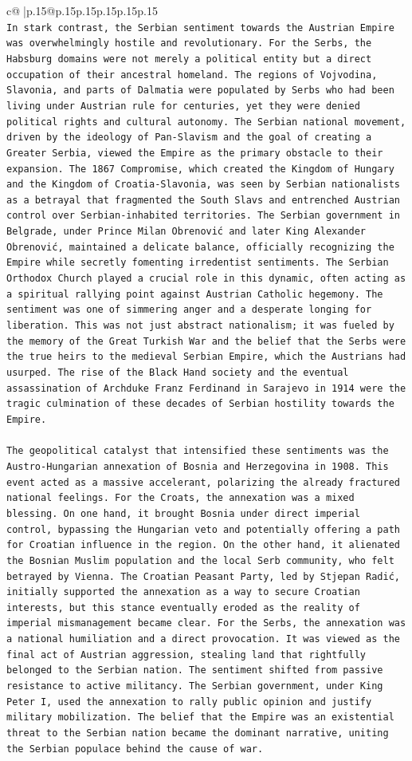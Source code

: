 \documentclass{article}
\begin{document}
{\begin{supertabular}{c@{$\;$}|p{.15\linewidth}@{}p{.15\linewidth}p{.15\linewidth}p{.15\linewidth}p{.15\linewidth}p{.15\linewidth}}
{{{\\ 
\texttt{In stark contrast, the Serbian sentiment towards the Austrian Empire was overwhelmingly hostile and revolutionary. For the Serbs, the Habsburg domains were not merely a political entity but a direct occupation of their ancestral homeland. The regions of Vojvodina, Slavonia, and parts of Dalmatia were populated by Serbs who had been living under Austrian rule for centuries, yet they were denied political rights and cultural autonomy. The Serbian national movement, driven by the ideology of Pan{-}Slavism and the goal of creating a Greater Serbia, viewed the Empire as the primary obstacle to their expansion. The 1867 Compromise, which created the Kingdom of Hungary and the Kingdom of Croatia{-}Slavonia, was seen by Serbian nationalists as a betrayal that fragmented the South Slavs and entrenched Austrian control over Serbian{-}inhabited territories. The Serbian government in Belgrade, under Prince Milan Obrenović and later King Alexander Obrenović, maintained a delicate balance, officially recognizing the Empire while secretly fomenting irredentist sentiments. The Serbian Orthodox Church played a crucial role in this dynamic, often acting as a spiritual rallying point against Austrian Catholic hegemony. The sentiment was one of simmering anger and a desperate longing for liberation. This was not just abstract nationalism; it was fueled by the memory of the Great Turkish War and the belief that the Serbs were the true heirs to the medieval Serbian Empire, which the Austrians had usurped. The rise of the Black Hand society and the eventual assassination of Archduke Franz Ferdinand in Sarajevo in 1914 were the tragic culmination of these decades of Serbian hostility towards the Empire.} \\
\\ 
\texttt{The geopolitical catalyst that intensified these sentiments was the Austro{-}Hungarian annexation of Bosnia and Herzegovina in 1908. This event acted as a massive accelerant, polarizing the already fractured national feelings. For the Croats, the annexation was a mixed blessing. On one hand, it brought Bosnia under direct imperial control, bypassing the Hungarian veto and potentially offering a path for Croatian influence in the region. On the other hand, it alienated the Bosnian Muslim population and the local Serb community, who felt betrayed by Vienna. The Croatian Peasant Party, led by Stjepan Radić, initially supported the annexation as a way to secure Croatian interests, but this stance eventually eroded as the reality of imperial mismanagement became clear. For the Serbs, the annexation was a national humiliation and a direct provocation. It was viewed as the final act of Austrian aggression, stealing land that rightfully belonged to the Serbian nation. The sentiment shifted from passive resistance to active militancy. The Serbian government, under King Peter I, used the annexation to rally public opinion and justify military mobilization. The belief that the Empire was an existential threat to the Serbian nation became the dominant narrative, uniting the Serbian populace behind the cause of war.} \\
}}}
\end{supertabular}}
\end{document}
